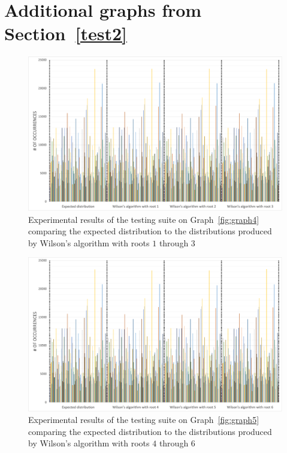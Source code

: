 \documentclass[11pt]{article}
\begin{document}
\begin{appendices}\label{appendix}

\section{Additional graphs from Section~\ref{test2}}\label{appendix1}

\begin{figure}[ht]
\includegraphics[scale=0.60]{fig4.png}
\caption{Experimental results of the testing suite on Graph~\ref{fig:graph4} comparing the expected distribution to the distributions produced by Wilson's algorithm with roots $1$ through $3$}
\centering
\label{fig4}
\end{figure}

\begin{figure}[ht]
\includegraphics[scale=0.60]{fig5.png}
\caption{Experimental results of the testing suite on Graph~\ref{fig:graph5} comparing the expected distribution to the distributions produced by Wilson's algorithm with roots $4$ through $6$}
\centering
\label{fig5}
\end{figure}

\end{appendices}
\end{document}
